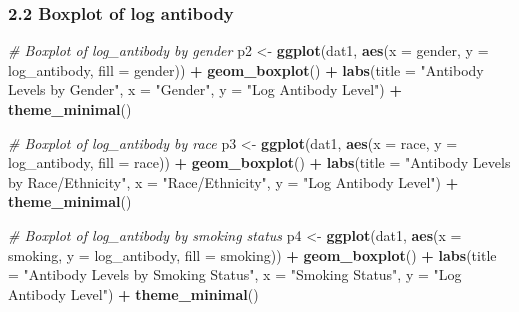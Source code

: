 \documentclass[
]{article}
\newenvironment{Shaded}{\begin{snugshade}}{\end{snugshade}}
\newcommand{\AttributeTok}[1]{\textcolor[rgb]{0.13,0.29,0.53}{#1}}
\newcommand{\CommentTok}[1]{\textcolor[rgb]{0.56,0.35,0.01}{\textit{#1}}}
\newcommand{\FunctionTok}[1]{\textcolor[rgb]{0.13,0.29,0.53}{\textbf{#1}}}
\newcommand{\NormalTok}[1]{#1}
\newcommand{\OtherTok}[1]{\textcolor[rgb]{0.56,0.35,0.01}{#1}}
\newcommand{\SpecialCharTok}[1]{\textcolor[rgb]{0.81,0.36,0.00}{\textbf{#1}}}
\newcommand{\StringTok}[1]{\textcolor[rgb]{0.31,0.60,0.02}{#1}}
\begin{document}
\subsubsection{2.2 Boxplot of log
antibody}\label{boxplot-of-log-antibody}

\begin{Shaded}
\begin{Highlighting}[]
\CommentTok{\# Boxplot of log\_antibody by gender}
\NormalTok{p2 }\OtherTok{\textless{}{-}} \FunctionTok{ggplot}\NormalTok{(dat1, }\FunctionTok{aes}\NormalTok{(}\AttributeTok{x =}\NormalTok{ gender, }\AttributeTok{y =}\NormalTok{ log\_antibody, }\AttributeTok{fill =}\NormalTok{ gender)) }\SpecialCharTok{+}
  \FunctionTok{geom\_boxplot}\NormalTok{() }\SpecialCharTok{+}
  \FunctionTok{labs}\NormalTok{(}\AttributeTok{title =} \StringTok{"Antibody Levels by Gender"}\NormalTok{,}
       \AttributeTok{x =} \StringTok{"Gender"}\NormalTok{, }
       \AttributeTok{y =} \StringTok{"Log Antibody Level"}\NormalTok{) }\SpecialCharTok{+}
  \FunctionTok{theme\_minimal}\NormalTok{()}

\CommentTok{\# Boxplot of log\_antibody by race}
\NormalTok{p3 }\OtherTok{\textless{}{-}} \FunctionTok{ggplot}\NormalTok{(dat1, }\FunctionTok{aes}\NormalTok{(}\AttributeTok{x =}\NormalTok{ race, }\AttributeTok{y =}\NormalTok{ log\_antibody, }\AttributeTok{fill =}\NormalTok{ race)) }\SpecialCharTok{+}
  \FunctionTok{geom\_boxplot}\NormalTok{() }\SpecialCharTok{+}
  \FunctionTok{labs}\NormalTok{(}\AttributeTok{title =} \StringTok{"Antibody Levels by Race/Ethnicity"}\NormalTok{,}
       \AttributeTok{x =} \StringTok{"Race/Ethnicity"}\NormalTok{, }
       \AttributeTok{y =} \StringTok{"Log Antibody Level"}\NormalTok{) }\SpecialCharTok{+}
  \FunctionTok{theme\_minimal}\NormalTok{()}

\CommentTok{\# Boxplot of log\_antibody by smoking status}
\NormalTok{p4 }\OtherTok{\textless{}{-}} \FunctionTok{ggplot}\NormalTok{(dat1, }\FunctionTok{aes}\NormalTok{(}\AttributeTok{x =}\NormalTok{ smoking, }\AttributeTok{y =}\NormalTok{ log\_antibody, }\AttributeTok{fill =}\NormalTok{ smoking)) }\SpecialCharTok{+}
  \FunctionTok{geom\_boxplot}\NormalTok{() }\SpecialCharTok{+}
  \FunctionTok{labs}\NormalTok{(}\AttributeTok{title =} \StringTok{"Antibody Levels by Smoking Status"}\NormalTok{,}
       \AttributeTok{x =} \StringTok{"Smoking Status"}\NormalTok{, }
       \AttributeTok{y =} \StringTok{"Log Antibody Level"}\NormalTok{) }\SpecialCharTok{+}
  \FunctionTok{theme\_minimal}\NormalTok{()}


\end{Highlighting}
\end{Shaded}
\end{document}
